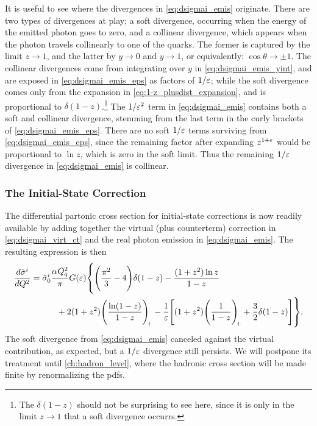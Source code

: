 It is useful to see where the divergences in \cref{eq:dsigmai_emis} originate. There are two types of divergences at play; a soft divergence, occurring when the energy of the emitted photon goes to zero, and a collinear divergence, which appears when the photon travels collinearly to one of the quarks. The former is captured by the limit $z\to1$, and the latter by $y\to0$ and $y\to1$, or equivalently: $\cos\theta\to\pm1$.
The collinear divergences come from integrating over $y$ in \cref{eq:dsigmai_emis_yint}, and are exposed in \cref{eq:dsigmai_emis_eps} as factors of $1/\varepsilon$; while the soft divergence comes only from the expansion in \cref{eq:1-z_plusdist_expansion}, and is proportional to $\delta(1-z)$.\footnote{The $\delta(1-z)$ should not be surprising to see here, since it is only in the limit $z\to1$ that a soft divergence occurrs.}
The $1/\varepsilon^2$ term in \cref{eq:dsigmai_emis} contains both a soft and collinear divergence, stemming from the last term in the curly brackets of \cref{eq:dsigmai_emis_eps}.
There are no soft $1/\varepsilon$ terms surviving from \cref{eq:dsigmai_emis_eps}, since the remaining factor after expanding $z^{1+\varepsilon}$ would be proportional to $\ln{z}$, which is zero in the soft limit.
Thus the remaining $1/\varepsilon$ divergence in \cref{eq:dsigmai_emis} is collinear.



\subsubsection{The Initial-State Correction}
The differential partonic cross section for initial-state corrections is now readily available by adding together the virtual (plus counterterm) correction in \cref{eq:dsigmai_virt_ct} and the real photon emission in \cref{eq:dsigmai_emis}. 
The resulting expression is then
\begin{equation}
    \begin{split}
    \frac{d\hat\sigma^i}{dQ^2} &= \hat\sigma^i_0 \frac{\alpha Q_q^2}{\pi} G(\eps)
    \vastl\{
        \Biggl(\frac{\pi^2}{3} - 4\Biggr)\delta(1-z)
        - \frac{(1+z^2)\ln z}{1-z}
        \\ &\hspace{3em}
        + 2(1+z^2) \plusdistln
        - \frac{1}{\eps}\Biggl[ (1+z^2)\plusdist + \frac{3}{2}\delta(1-z) \Biggr]
    \vastr\}.
    \end{split}
    \label{eq:dsigmai_nlo}
\end{equation}
The soft divergence from \cref{eq:dsigmai_emis} canceled against the virtual contribution, as expected, but a $1/\varepsilon$ divergence still persists. We will postpone its treatment until \cref{ch:hadron_level}, where the hadronic cross section will be made finite by renormalizing the \glspl{pdf}.

